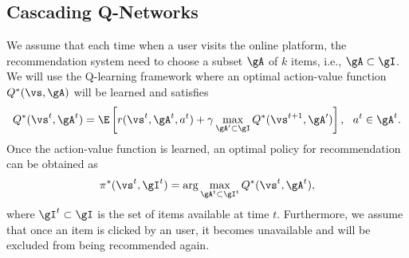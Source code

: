 \documentclass{article} %
\newcommand{\Le}[1]{{\color{red}{\bf\sf [ #1]}}}
\begin{document}

\vspace{-3mm}
\subsection{Cascading Q-Networks}
\vspace{-3mm}

We assume that each time when a user visits the online platform,
the recommendation system need to choose a subset $\gA$ of $k$ items, i.e., $\gA \subset \gI$. We will use the Q-learning framework where an optimal action-value function $Q^*(\vs,\gA)$ will be learned and satisfies
{\small \begin{equation}\label{eqn:bellman}
		Q^*(\vs^t, \gA^t) =\E\left[r(\vs^t, \gA^t, a^t) + \gamma  \max_{\gA'\subset \gI}Q^*(\vs^{t+1}, \gA')\right],~~a^t \in \gA^t.
\end{equation}}
Once the action-value function is learned, an optimal policy for recommendation can be obtained as
{\small \begin{equation}\label{eq:policy}
	\pi^\ast(\vs^t, \gI^t)=\arg\max_{\gA^t\subset \gI^t}Q^*(\vs^t, \gA^t),
\end{equation}}
where $\gI^t \subset \gI$ is the set of items available at time $t$. Furthermore, we assume that once an item is clicked by an user, it becomes unavailable and will be excluded from being recommended again.
\end{document}
